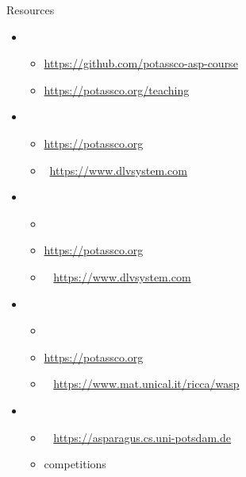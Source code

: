 \begin{frame}{Resources}
  \begin{itemize}
  \item {}
    \begin{itemize}
    \item \url{https://github.com/potassco-asp-course}
    \item \url{https://potassco.org/teaching}
    \end{itemize}
  \item {}
    \begin{itemize}
    \item \alert{\clingo} \cite{gekakasc17a}\hfill \url{https://potassco.org}
    \item \dlv\           \cite{dlv03a,alcadofuleperiveza17a}\hfill \url{https://www.dlvsystem.com}
    \end{itemize}
  \item {}
    \begin{itemize}
    \item \lparse\                                                %
    \item \alert{\gringo} \cite{gescth07a,gekaosscth09a,gekakosc11a}\hfill \url{https://potassco.org}
    \item \idlv\          \cite{cafupeza17a}                        \hfill\url{https://www.dlvsystem.com}
    \end{itemize}
  \item {}
    \begin{itemize}
    \item \smodels\       \cite{niesim96a,siniso02a}              %
    \item \alert{\clasp}  \cite{gekanesc07a,gekasc09c}              \hfill \url{https://potassco.org}
    \item \wasp\          \cite{aldofaleri13a}                      \hfill \url{https://www.mat.unical.it/ricca/wasp}
    \end{itemize}
  \item {}
    \begin{itemize}
    \item \asparagus\     \cite{boansctr04a}                        \hfill \url{https://asparagus.cs.uni-potsdam.de}
    \item competitions \cite{contest07a,contest09a,contest11a,contest11a,cagemari14a}
    \end{itemize}
  \end{itemize}
\end{frame}
%
